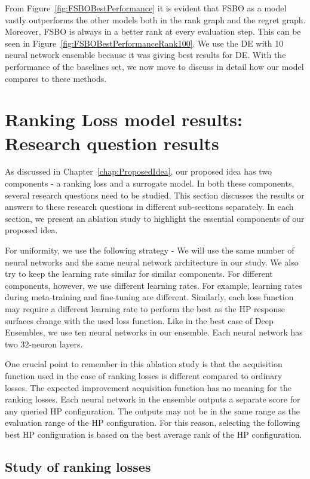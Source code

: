 \documentclass[12pt, twoside, ngerman]{report}
\begin{document}
From Figure~\ref{fig:FSBOBestPerformance} it is evident that FSBO as a model vastly outperforms the other models both in the rank graph and the regret graph.
Moreover,  FSBO is always in a better rank at every evaluation step.
This can be seen in Figure~\ref{fig:FSBOBestPerformanceRank100}.
We use the DE with 10 neural network ensemble because it was giving best results for DE.
With the performance of the baselines set,  we now move to discuss in detail how our model compares to these methods.


\section{Ranking Loss model results: Research question results}

As discussed in Chapter~\ref{chap:ProposedIdea},  our proposed idea has two components - a ranking loss and a surrogate model.
In both these components, several research questions need to be studied.
This section discusses the results or answers to these research questions in different sub-sections separately.
In each section, we present an ablation study to highlight the essential components of our proposed idea.

For uniformity, we use the following strategy - We will use the same number of neural networks and the same neural network architecture in our study.
We also try to keep the learning rate similar for similar components.
For different components, however, we use different learning rates.
For example, learning rates during meta-training and fine-tuning are different.
Similarly, each loss function may require a different learning rate to perform the best as the HP response surfaces change with the used loss function.
Like in the best case of Deep Ensembles, we use ten neural networks in our ensemble. Each neural network has two 32-neuron layers.

One crucial point to remember in this ablation study is that the acquisition function used in the case of ranking losses is different compared to ordinary losses. The expected improvement acquisition function has no meaning for the ranking losses. Each neural network in the ensemble outputs a separate score for any queried HP configuration. The outputs may not be in the same range as the evaluation range of the HP configuration. For this reason, selecting the following best HP configuration is based on the best average rank of the HP configuration.

\subsection{Study of ranking losses}
\end{document}

